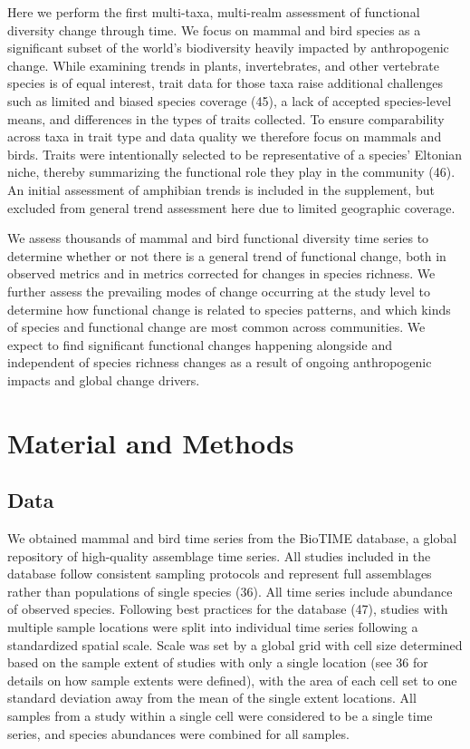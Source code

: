 \documentclass{article}
\begin{document}
Here we perform the first multi-taxa, multi-realm assessment of
functional diversity change through time. We focus on mammal and bird
species as a significant subset of the world's biodiversity heavily
impacted by anthropogenic change. While examining trends in plants,
invertebrates, and other vertebrate species is of equal interest, trait
data for those taxa raise additional challenges such as limited and
biased species coverage (45), a lack of accepted species-level means,
and differences in the types of traits collected. To ensure
comparability across taxa in trait type and data quality we therefore
focus on mammals and birds. Traits were intentionally selected to be
representative of a species' Eltonian niche, thereby summarizing the
functional role they play in the community (46). An initial assessment
of amphibian trends is included in the supplement, but excluded from
general trend assessment here due to limited geographic coverage.

We assess thousands of mammal and bird functional diversity time series
to determine whether or not there is a general trend of functional
change, both in observed metrics and in metrics corrected for changes in
species richness. We further assess the prevailing modes of change
occurring at the study level to determine how functional change is
related to species patterns, and which kinds of species and functional
change are most common across communities. We expect to find significant
functional changes happening alongside and independent of species
richness changes as a result of ongoing anthropogenic impacts and global
change drivers.

\hypertarget{material-and-methods}{%
\section{Material and Methods}\label{material-and-methods}}

\hypertarget{data}{%
\subsection{Data}\label{data}}

We obtained mammal and bird time series from the BioTIME database, a
global repository of high-quality assemblage time series. All studies
included in the database follow consistent sampling protocols and
represent full assemblages rather than populations of single species
(36). All time series include abundance of observed species. Following
best practices for the database (47), studies with multiple sample
locations were split into individual time series following a
standardized spatial scale. Scale was set by a global grid with cell
size determined based on the sample extent of studies with only a single
location (see 36 for details on how sample extents were defined), with
the area of each cell set to one standard deviation away from the mean
of the single extent locations. All samples from a study within a single
cell were considered to be a single time series, and species abundances
were combined for all samples.
\end{document}
